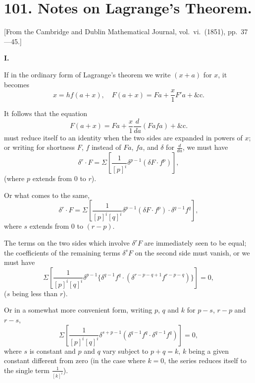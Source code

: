 \documentclass[11pt,a4paper]{article}
\theoremstyle{plain}
\begin{document}
\section*{101. Notes on Lagrange's Theorem.}

[From the Cambridge and Dublin Mathematical Journal, vol.\ vi.\ (1851), pp.\ 37---45.]

\bigskip
\noindent\textbf{I.}

If in the ordinary form of Lagrange's theorem we write $(x+a)$ for $x$, it becomes
\begin{equation}
x = hf(a+x), \quad F(a+x) = Fa + \frac{x}{1}F'a + \&\text{c.}
\tag{1}
\end{equation}

It follows that the equation
\begin{equation}
F(a+x) = Fa + \frac{x}{1}\frac{d}{da}(Fafa) + \&\text{c.}
\tag{2}
\end{equation}
must reduce itself to an identity when the two sides are expanded in powers of $x$;
or writing for shortness $F$, $f$ instead of $Fa$, $fa$, and $\delta$ for $\frac{d}{da}$, we must have
\begin{equation}
\delta^r \cdot F = \Sigma \left[ \frac{1}{[p]^i} \delta^{p-1} (\delta F \cdot f^p) \right],
\tag{3}
\end{equation}
(where $p$ extends from $0$ to $r$).

Or what comes to the same,
\begin{equation}
\delta^r \cdot F = \Sigma \left[ \frac{1}{[p]^i [q]^i} \delta^{p-1} (\delta F \cdot f^p) \cdot \delta^{q-1} f^q \right],
\tag{4}
\end{equation}
where $s$ extends from $0$ to $(r-p)$.

The terms on the two sides which involve $\delta^r F$ are immediately seen to be equal; the coefficients of the remaining terms $\delta^s F$ on the second side must vanish, or we must have
\begin{equation}
\Sigma \left[ \frac{1}{[p]^i [q]^i} \delta^{p-1} \{ \delta^{q-1} f^q \cdot (\delta^{r-p-q+1} f^{r-p-q}) \} \right] = 0,
\tag{5}
\end{equation}
($s$ being less than $r$).

Or in a somewhat more convenient form, writing $p$, $q$ and $k$ for $p-s$, $r-p$ and $r-s$,
\begin{equation}
\Sigma \left[ \frac{1}{[p]^i [q]^i} \delta^{s+p-1} (\delta^{q-1} f^q \cdot \delta^{q-1} f^q) \right] = 0,
\tag{6}
\end{equation}
where $s$ is constant and $p$ and $q$ vary subject to $p+q=k$, $k$ being a given constant different from zero (in the case where $k=0$, the series reduces itself to the single term $\frac{1}{[k]^i}$).
\end{document}
